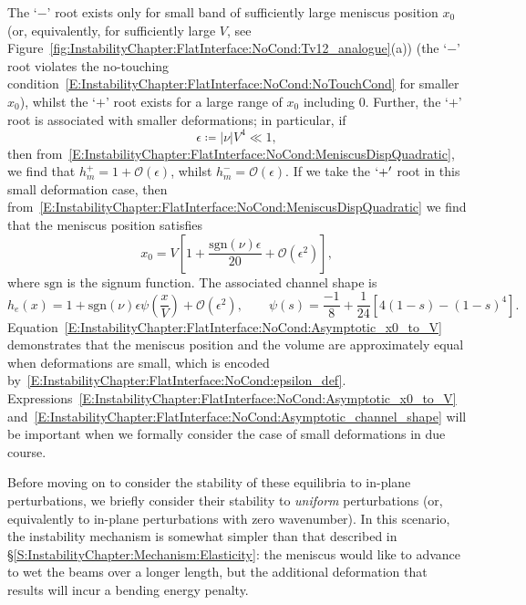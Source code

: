 The `$-$' root exists only for small band of sufficiently large meniscus position $x_0$ (or, equivalently, for sufficiently large $V$, see Figure~\ref{fig:InstabilityChapter:FlatInterface:NoCond:Tv12_analogue}(a)) (the `$-$' root violates the no-touching condition~\eqref{E:InstabilityChapter:FlatInterface:NoCond:NoTouchCond} for smaller $x_0$), whilst the `$+$' root exists for a large range of $x_0$ including $0$.  Further, the `$+$' root is associated with smaller deformations; in particular, if
\begin{equation}\label{E:InstabilityChapter:FlatInterface:NoCond:epsilon_def}
\epsilon \coloneqq |\nu| V^4 \ll 1,
\end{equation}
then from~\eqref{E:InstabilityChapter:FlatInterface:NoCond:MeniscusDispQuadratic}, we find that $h_m^+ = 1 + \mathcal{O}(\epsilon)$, whilst $h_m^- = \mathcal{O}(\epsilon)$. If we take the $`+'$ root in this small deformation case, then from~\eqref{E:InstabilityChapter:FlatInterface:NoCond:MeniscusDispQuadratic} we find that the meniscus position satisfies
\begin{equation}\label{E:InstabilityChapter:FlatInterface:NoCond:Asymptotic_x0_to_V}
 x_0 = V\left[1 + \frac{\mathrm{sgn}(\nu)\epsilon}{20}  + \mathcal{O}(\epsilon^2)\right],
\end{equation}
where $\mathrm{sgn}$ is the signum function. The associated channel shape is
\begin{equation}\label{E:InstabilityChapter:FlatInterface:NoCond:Asymptotic_channel_shape}
h_e(x) = 1 + \mathrm{sgn}(\nu)\epsilon\psi \left(\frac{x}{V}\right) + \mathcal{O}(\epsilon^2),\qquad \psi(s) = \frac{-1}{8} + \frac{1}{24}\left[4(1-s) - (1-s)^4\right].
\end{equation} Equation~\eqref{E:InstabilityChapter:FlatInterface:NoCond:Asymptotic_x0_to_V} demonstrates that the meniscus position and the volume are approximately equal when deformations are small, which is encoded by~\eqref{E:InstabilityChapter:FlatInterface:NoCond:epsilon_def}. Expressions~\eqref{E:InstabilityChapter:FlatInterface:NoCond:Asymptotic_x0_to_V} and~\eqref{E:InstabilityChapter:FlatInterface:NoCond:Asymptotic_channel_shape} will be important when we formally consider the case of small deformations in due course.

Before moving on to consider the stability of these equilibria to in-plane perturbations, we briefly consider their stability to \textit{uniform} perturbations (or, equivalently to in-plane perturbations with zero wavenumber). In this scenario, the instability mechanism is somewhat simpler than that described in \S\ref{S:InstabilityChapter:Mechanism:Elasticity}: the meniscus would like to advance to wet the beams over a longer length, but the additional deformation that results will incur a bending energy penalty.

